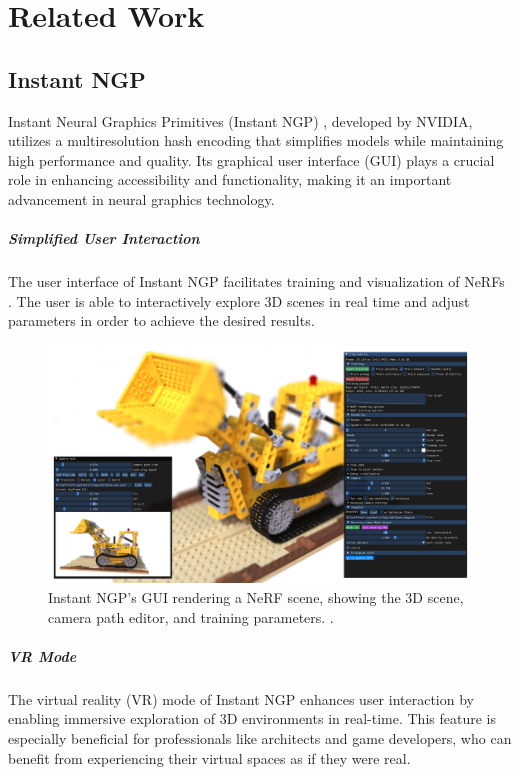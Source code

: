 %
\chapter{Related Work}
\label{sec:related}

\section{Instant NGP}

Instant Neural Graphics Primitives (Instant NGP) \cite{muller_instant_2022}, developed by NVIDIA, utilizes a multiresolution hash encoding that simplifies models while maintaining high performance and quality.
Its graphical user interface (GUI) plays a crucial role in enhancing accessibility and functionality, making it an important advancement in neural graphics technology.

\paragraph{Simplified User Interaction}
The user interface of Instant NGP facilitates training and visualization of NeRFs .
The user is able to interactively explore 3D scenes in real time and adjust parameters in order to achieve the desired results.

\begin{figure}[h!]
  \centering
  \includegraphics[width=\textwidth]{figures/realted-instant-ngp.png}
  \caption{Instant NGP's GUI rendering a NeRF scene, showing the 3D scene, camera path editor, and training parameters.
   \cite{muller_instant_2022}.}
  \label{fig:instant-ngp}
\end{figure}

\paragraph{VR Mode}
The virtual reality (VR) mode of Instant NGP enhances user interaction by enabling immersive exploration of 3D environments in real-time.
This feature is especially beneficial for professionals like architects and game developers, who can benefit from experiencing their virtual spaces as if they were real.

